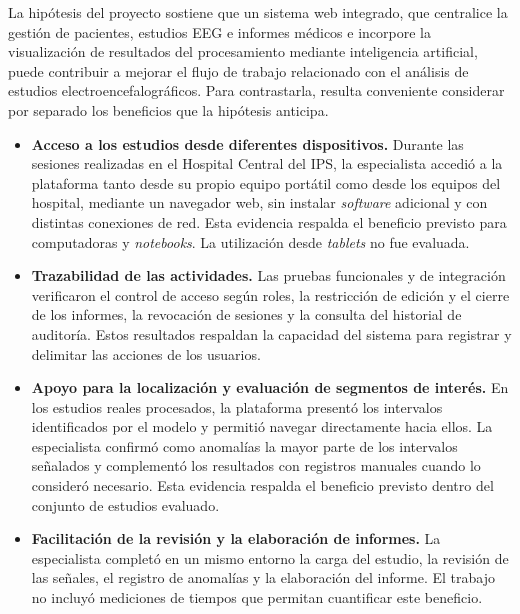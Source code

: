 La hipótesis del proyecto sostiene que un sistema web integrado, que centralice la gestión de pacientes, estudios EEG e informes médicos e incorpore la visualización de resultados del procesamiento mediante inteligencia artificial, puede contribuir a mejorar el flujo de trabajo relacionado con el análisis de estudios electroencefalográficos.
Para contrastarla, resulta conveniente considerar por separado los beneficios que la hipótesis anticipa.

\begin{itemize}
    \item \textbf{Acceso a los estudios desde diferentes dispositivos.}
    Durante las sesiones realizadas en el Hospital Central del IPS, la especialista accedió a la plataforma tanto desde su propio equipo portátil como desde los equipos del hospital, mediante un navegador web, sin instalar \textit{software} adicional y con distintas conexiones de red.
    Esta evidencia respalda el beneficio previsto para computadoras y \textit{notebooks}.
    La utilización desde \textit{tablets} no fue evaluada.

    \item \textbf{Trazabilidad de las actividades.}
    Las pruebas funcionales y de integración verificaron el control de acceso según roles, la restricción de edición y el cierre de los informes, la revocación de sesiones y la consulta del historial de auditoría.
    Estos resultados respaldan la capacidad del sistema para registrar y delimitar las acciones de los usuarios.

    \item \textbf{Apoyo para la localización y evaluación de segmentos de interés.}
    En los estudios reales procesados, la plataforma presentó los intervalos identificados por el modelo y permitió navegar directamente hacia ellos.
    La especialista confirmó como anomalías la mayor parte de los intervalos señalados y complementó los resultados con registros manuales cuando lo consideró necesario.
    Esta evidencia respalda el beneficio previsto dentro del conjunto de estudios evaluado.

    \item \textbf{Facilitación de la revisión y la elaboración de informes.}
    La especialista completó en un mismo entorno la carga del estudio, la revisión de las señales, el registro de anomalías y la elaboración del informe.
    El trabajo no incluyó mediciones de tiempos que permitan cuantificar este beneficio.
\end{itemize}

